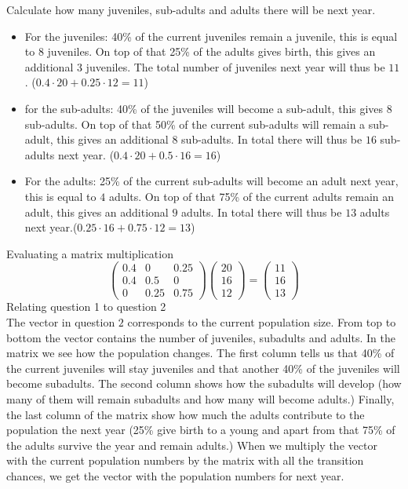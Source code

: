 \documentclass[a4paper]{report}
\begin{document}
\begin{Answer}[ref=alba]
\Question Calculate how many juveniles, sub-adults and adults there will be next year. 
\begin{itemize}
\item For the juveniles: 40\% of the current juveniles remain a juvenile, this is equal to $8$ juveniles. On top of that 25\% of the adults gives birth, this gives an additional $3$ juveniles. The total number of juveniles next year will thus be $11$. ($0.4 \cdot 20 + 0.25 \cdot 12 = 11$)
\item  for the sub-adults: 40\% of the juveniles will become a sub-adult, this gives $8$ sub-adults. On top of that 50\% of the current sub-adults will remain a sub-adult, this gives an additional $8$ sub-adults. In total there will thus be $16$ sub-adults next year. ($0.4 \cdot 20 + 0.5 \cdot 16 = 16$)
\item For the adults: 25\% of the current sub-adults will become an adult next year, this is equal to $4$ adults. On top of that 75\% of the current adults remain an adult, this gives an additional $9$ adults. In total there will thus be $13$ adults next year.($0.25\cdot 16+0.75 \cdot 12 = 13$)
\end{itemize}
\Question Evaluating a matrix multiplication
\begin{equation*}
\begin{pmatrix}0.4&0&0.25\\0.4&0.5&0\\0&0.25&0.75\end{pmatrix}\begin{pmatrix}20\\16\\12\end{pmatrix}=\begin{pmatrix}11\\16\\13\end{pmatrix}
\end{equation*}
\Question Relating question 1 to question 2\\
The vector in question $2$ corresponds to the current population size. From top to bottom the vector contains the number of juveniles, subadults and adults. In the matrix we see how the population changes. The first column tells us that 40\% of the current juveniles will stay juveniles and that another 40\% of the juveniles will become subadults. The second column shows how the subadults will develop (how many of them will remain subadults and how many will become adults.) Finally, the last column of the matrix show how much the adults contribute to the population the next year (25\% give birth to a young and apart from that 75\% of the adults survive the year and remain adults.) When we multiply the vector with the current population numbers by the matrix with all the transition chances, we get the vector with the population numbers for next year.

\end{Answer}
\end{document}
